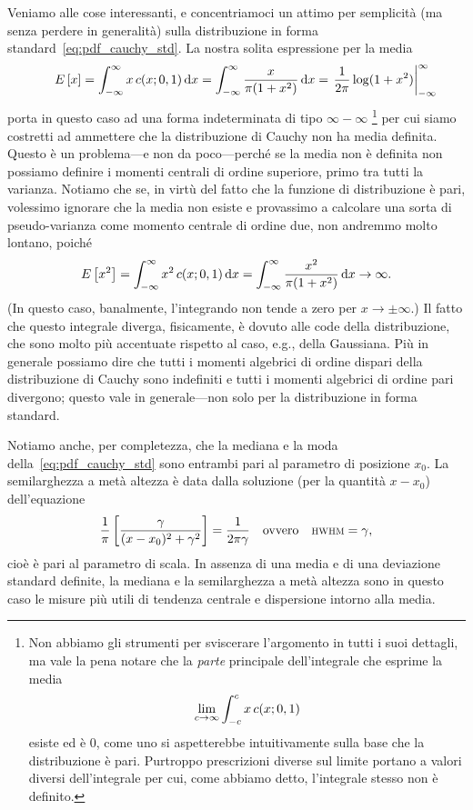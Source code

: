 Veniamo alle cose interessanti, e concentriamoci un attimo per semplicità
(ma senza perdere in generalità) sulla distribuzione in forma
standard~\eqref{eq:pdf_cauchy_std}. La nostra solita espressione per la media
\begin{align*}
  \expect{x} = \int_{-\infty}^\infty x\,\cauchypdf[0, 1]{x} \diff =
  \int_{-\infty}^\infty \frac{x}{\pi(1 + x^2)} \diff =
  \eval{\frac{1}{2\pi} \log(1 + x^2)}{-\infty}{\infty}
\end{align*}
porta in questo caso ad una forma indeterminata di tipo $\infty - \infty$%
\footnote{Non abbiamo gli strumenti per sviscerare l'argomento in tutti i suoi
  dettagli, ma vale la pena notare che la \emph{parte} principale dell'integrale
  che esprime la media
  \begin{align*}
    \lim_{c \rightarrow \infty} \int_{-c}^c x\,\cauchypdf[0, 1]{x}
  \end{align*}
  esiste ed è $0$, come uno si aspetterebbe intuitivamente sulla base che
  la distribuzione è pari. Purtroppo prescrizioni diverse sul limite
  portano a valori diversi dell'integrale per cui, come abbiamo detto,
  l'integrale stesso non è definito.
}
per cui siamo costretti ad ammettere che la distribuzione di Cauchy non ha
media definita. Questo è un problema---e non da poco---perché se la media
non è definita non possiamo definire i momenti centrali di ordine superiore,
primo tra tutti la varianza. Notiamo che se, in virtù del fatto che la
funzione di distribuzione è pari, volessimo ignorare che la media non esiste
e provassimo a calcolare una sorta di pseudo-varianza come momento centrale
di ordine due, non andremmo molto lontano, poiché
\begin{align*}
  \expect{x^2} = \int_{-\infty}^\infty x^2\,\cauchypdf[0, 1]{x} \diff =
  \int_{-\infty}^\infty \frac{x^2}{\pi(1 + x^2)} \diff \rightarrow \infty.
\end{align*}
(In questo caso, banalmente, l'integrando non tende a zero per
$x \rightarrow \pm \infty$.) Il fatto che questo integrale diverga, fisicamente,
è dovuto alle code della distribuzione, che sono molto più accentuate
rispetto al caso, e.g., della Gaussiana. Più in generale possiamo dire che
tutti i momenti algebrici di ordine dispari della distribuzione di Cauchy
sono indefiniti e tutti i momenti algebrici di ordine pari divergono; questo
vale in generale---non solo per la distribuzione in forma standard.

Notiamo anche, per completezza, che la mediana e la moda
della~\eqref{eq:pdf_cauchy_std} sono entrambi pari al parametro di posizione
$x_0$. La semilarghezza a metà altezza è data dalla soluzione (per la
quantità $x - x_0$) dell'equazione
\begin{align*}
  \frac{1}{\pi} \left[\frac{\gamma}{(x - x_0)^2 + \gamma^2} \right] =
  \frac{1}{2\pi\gamma} \quad \text{ovvero} \quad
  {\scriptstyle \textsc{HWHM}} = \gamma,
\end{align*}
cioè è pari al parametro di scala. In assenza di una media e di una
deviazione standard definite, la mediana e la semilarghezza a metà altezza
sono in questo caso le misure più utili di tendenza centrale e dispersione
intorno alla media.


